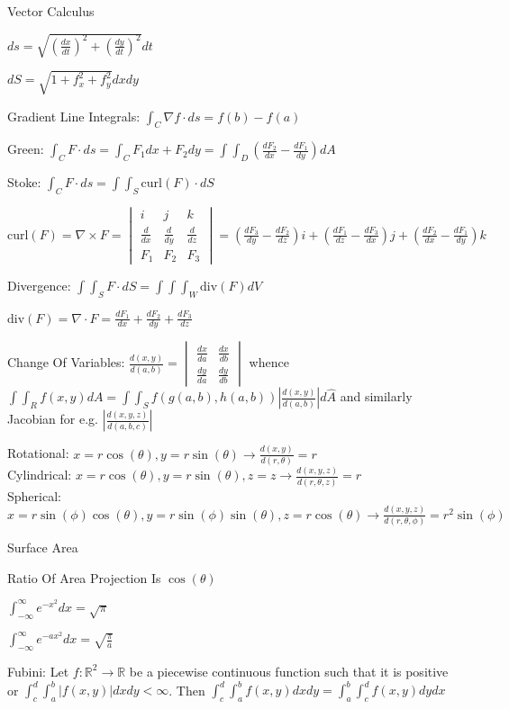 Vector Calculus

$ds=\sqrt{\left(\frac{dx}{dt} \right)^2 + \left(\frac{dy}{dt} \right)^2} dt$

$dS = \sqrt{1+f_x^2+f_y^2} dx dy$

Gradient Line Integrals: $\int_C \nabla f \cdot ds = f(b)-f(a)$

Green: $\int_C F \cdot ds = \int_C F_1 dx + F_2 dy = \int \int_D \left(\frac{dF_2}{dx} - \frac{dF_1}{dy} \right) dA$

Stoke: $\int_C F \cdot ds = \int \int_S \text{curl}(F) \cdot dS$

$\text{curl}(F) = \nabla \times F = \begin{vmatrix} i & j & k \\ \frac{d}{dx} & \frac{d}{dy} & \frac{d}{dz} \\ F_1 & F_2 & F_3 \end{vmatrix} = \left(\frac{dF_3}{dy}-\frac{dF_2}{dz} \right) i + \left(\frac{dF_1}{dz}-\frac{dF_3}{dx} \right) j + \left(\frac{dF_2}{dx}-\frac{dF_1}{dy} \right) k$

Divergence: $\int \int_S F \cdot dS = \int \int \int_W \text{div}(F)dV$

$\text{div}(F)=\nabla \cdot F=\frac{dF_1}{dx}+\frac{dF_2}{dy}+\frac{dF_3}{dz}$

Change Of Variables: $\frac{d(x,y)}{d(a,b)} = \begin{vmatrix} \frac{dx}{da} & \frac{dx}{db} \\ \frac{dy}{da} & \frac{dy}{db} \end{vmatrix}$ whence $\int \int_R f(x,y) dA = \int \int_S f(g(a,b),h(a,b)) \left| \frac{d(x,y)}{d(a,b)} \right| d\hat{A}$ and similarly Jacobian for e.g. $\left| \frac{d(x,y,z)}{d(a,b,c)} \right|$

Rotational: $x=r\cos(\theta), y=r\sin(\theta) \to \frac{d(x,y)}{d(r,\theta)}=r$ \\
Cylindrical: $x=r\cos(\theta),y=r\sin(\theta),z=z \to \frac{d(x,y,z)}{d(r,\theta,z)}=r$ \\
Spherical: $x=r\sin(\phi)\cos(\theta),y=r\sin(\phi)\sin(\theta),z=r\cos(\theta) \to \frac{d(x,y,z)}{d(r,\theta,\phi)}=r^2\sin(\phi)$

Surface Area

Ratio Of Area Projection Is $\cos(\theta)$

$\int_{-\infty}^{\infty} e^{-x^2} dx = \sqrt{\pi}$

$\int_{-\infty}^{\infty} e^{-ax^2} dx = \sqrt{\frac{\pi}{a}}$

Fubini: Let $f: \mathbb{R}^2 \to \mathbb{R}$ be a piecewise continuous function such that it is positive or $\int_c^d \int_a^b |f(x,y)| dx dy < \infty$. Then $\int_c^d \int_a^b f(x,y) dx dy = \int_a^b \int_c^d f(x,y) dy dx$


